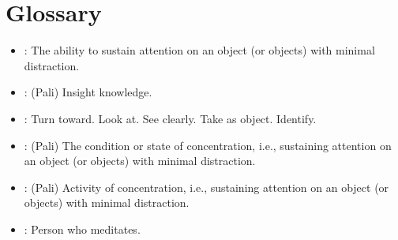 \documentclass[a5paper,10pt,english]{book}
\begin{document}
\appendix
\let\part\chapter
\let\chapter\section
\let\section\subsection
\let\subsection\subsubsection

\sphinxstepscope


\chapter{Glossary}
\label{\detokenize{back-glossary:glossary}}\label{\detokenize{back-glossary::doc}}\begin{itemize}
\item {} 
\sphinxAtStartPar
{}: The ability to sustain attention on an object (or
objects) with minimal distraction.

\item {} 
\sphinxAtStartPar
{}: (Pali) Insight knowledge.

\item {} 
\sphinxAtStartPar
{}: Turn toward. Look at. See clearly. Take as object.
Identify.

\item {} 
\sphinxAtStartPar
{}: (Pali) The condition or state of concentration, i.e.,
sustaining attention on an object (or objects) with minimal
distraction.

\item {} 
\sphinxAtStartPar
{}: (Pali) Activity of concentration, i.e., sustaining
attention on an object (or objects) with minimal distraction.

\item {} 
\sphinxAtStartPar
{}: Person who meditates.

\end{itemize}
\end{document}
